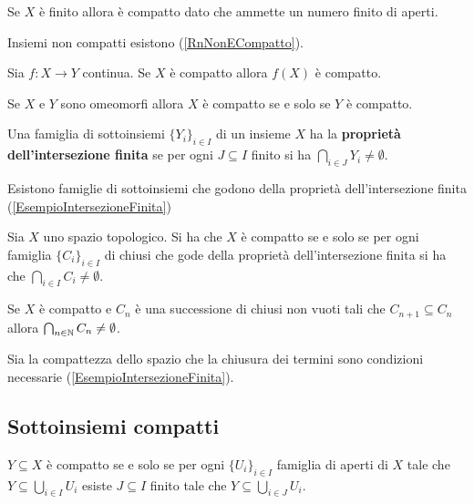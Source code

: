 \begin{multicols*}{2}
\begin{remark}
Se $X$ è finito allora è compatto dato che ammette un numero finito di aperti.
\end{remark}

\begin{remark}
Insiemi non compatti esistono (\ref{RnNonECompatto}).
\end{remark}

\begin{theorem}\label{ContinuePreservanoCompattezza}
Sia $f:X\to Y$ continua. Se $X$ è compatto allora $f(X)$ è compatto.
\end{theorem}
\begin{corollary}
Se $X$ e $Y$ sono omeomorfi allora $X$ è compatto se e solo se $Y$ è compatto.
\end{corollary}

\begin{definition}
Una famiglia di sottoinsiemi $\{Y_i\}_{i\in I}$ di un insieme $X$ ha la \textbf{proprietà dell'intersezione finita} se per ogni $J\subseteq I$ finito si ha $\bigcap_{i\in J}Y_i\neq \emptyset$.
\end{definition}

\begin{remark}
Esistono famiglie di sottoinsiemi che godono della proprietà dell'intersezione finita (\ref{EsempioIntersezioneFinita})
\end{remark}

\begin{proposition}
Sia $X$ uno spazio topologico. Si ha che $X$ è compatto se e solo se per ogni famiglia $\{C_i\}_{i\in I}$ di chiusi che gode della proprietà dell'intersezione finita si ha che $\bigcap_{i\in I} C_i\neq \emptyset$.
\end{proposition}
\begin{corollary}\label{IntersezioneDiChiusiInscatolatiInCompatto}
Se $X$ è compatto e $C_n$ è una successione di chiusi non vuoti tali che $C_{n+1}\subseteq C_n$ allora $\bigcap_{n\in \mathbb{N}}C_n\neq \emptyset$.
\end{corollary}

\begin{remark}
Sia la compattezza dello spazio che la chiusura dei termini sono condizioni necessarie (\ref{EsempioIntersezioneFinita}).
\end{remark}

\subsection{Sottoinsiemi compatti}
\begin{remark}
$Y\subseteq X$ è compatto se e solo se per ogni $\{U_i\}_{i\in I}$ famiglia di aperti di $X$ tale che $Y\subseteq \bigcup_{i\in I}U_i$ esiste $J\subseteq I$ finito tale che $Y\subseteq \bigcup_{i\in J}U_i$.
\end{remark}


\end{multicols*}
